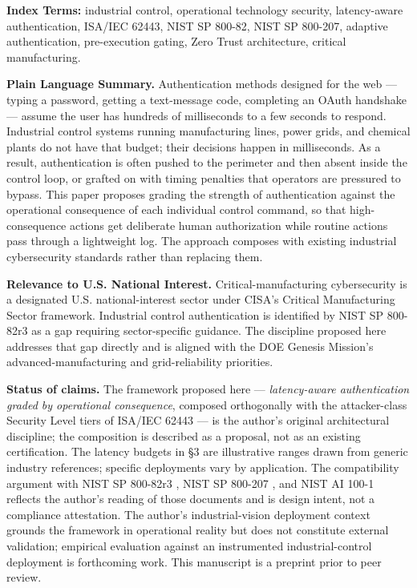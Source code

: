 \textbf{Index Terms:} industrial control, operational technology
security, latency-aware authentication, ISA/IEC 62443, NIST SP 800-82,
NIST SP 800-207, adaptive authentication, pre-execution gating, Zero
Trust architecture, critical manufacturing.

\textbf{Plain Language Summary.} Authentication methods designed for the
web --- typing a password, getting a text-message code, completing an
OAuth handshake --- assume the user has hundreds of milliseconds to a
few seconds to respond. Industrial control systems running manufacturing
lines, power grids, and chemical plants do not have that budget; their
decisions happen in milliseconds. As a result, authentication is often
pushed to the perimeter and then absent inside the control loop, or
grafted on with timing penalties that operators are pressured to bypass.
This paper proposes grading the strength of authentication against the
operational consequence of each individual control command, so that
high-consequence actions get deliberate human authorization while
routine actions pass through a lightweight log. The approach composes
with existing industrial cybersecurity standards rather than replacing
them.

\textbf{Relevance to U.S. National Interest.} Critical-manufacturing
cybersecurity is a designated U.S. national-interest sector under CISA's
Critical Manufacturing Sector framework. Industrial control
authentication is identified by NIST SP 800-82r3 as a gap requiring
sector-specific guidance. The discipline proposed here addresses that
gap directly and is aligned with the DOE Genesis Mission's
advanced-manufacturing and grid-reliability priorities.

\textbf{Status of claims.} The framework proposed here ---
\emph{latency-aware authentication graded by operational consequence},
composed orthogonally with the attacker-class Security Level tiers of
ISA/IEC 62443 \cite{ref1} --- is the author's original architectural
discipline; the composition is described as a proposal, not as an
existing certification. The latency budgets in §3 are illustrative
ranges drawn from generic industry references; specific deployments vary
by application. The compatibility argument with NIST SP 800-82r3
\cite{ref2}, NIST SP 800-207 \cite{ref6}, and NIST AI 100-1 \cite{ref11} reflects
the author's reading of those documents and is design intent, not a
compliance attestation. The author's industrial-vision deployment
context grounds the framework in operational reality but does not
constitute external validation; empirical evaluation against an
instrumented industrial-control deployment is forthcoming work. This
manuscript is a preprint prior to peer review.

